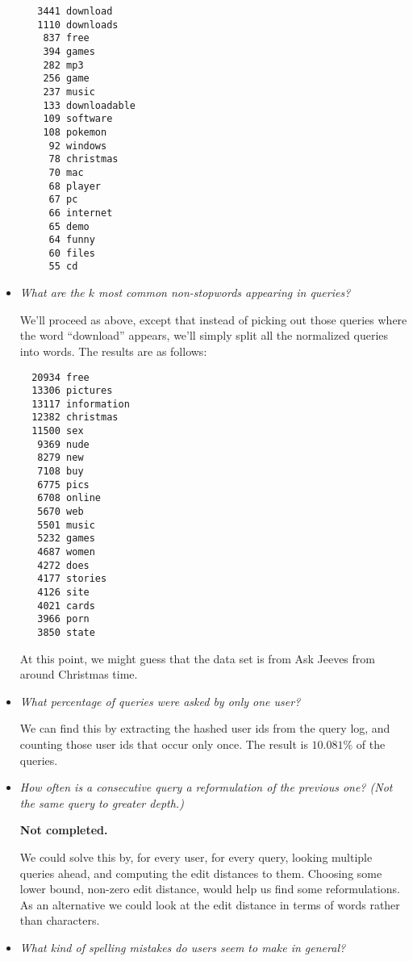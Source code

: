 \begin{itemize}
\begin{lstlisting}
   3441 download
   1110 downloads
    837 free
    394 games
    282 mp3
    256 game
    237 music
    133 downloadable
    109 software
    108 pokemon
     92 windows
     78 christmas
     70 mac
     68 player
     67 pc
     66 internet
     65 demo
     64 funny
     60 files
     55 cd
\end{lstlisting}

\item \emph{What are the $k$ most common non-stopwords appearing in queries?}

We'll proceed as above, except that instead of picking out those queries where
the word ``download'' appears, we'll simply split all the normalized
queries into words. The results are as follows:

\begin{lstlisting}
  20934 free
  13306 pictures
  13117 information
  12382 christmas
  11500 sex
   9369 nude
   8279 new
   7108 buy
   6775 pics
   6708 online
   5670 web
   5501 music
   5232 games
   4687 women
   4272 does
   4177 stories
   4126 site
   4021 cards
   3966 porn
   3850 state
\end{lstlisting}

At this point, we might guess that the data set is from Ask Jeeves from around
Christmas time.

\item \emph{What percentage of queries were asked by only one user?}

We can find this by extracting the hashed user ids from the query log, and
counting those user ids that occur only once. The result is $10.081\%$ of the
queries.

\item \emph{How often is a consecutive query a reformulation of the previous
one? (Not the same query to greater depth.)}

\textbf{Not completed.}

We could solve this by, for every user, for every query, looking multiple
queries ahead, and computing the edit distances\cite[.3 (pp.
58--60)]{irbook} to them. Choosing some lower bound, non-zero edit distance,
would help us find some reformulations. As an alternative we could look at the
edit distance in terms of words rather than characters.

\item \emph{What kind of spelling mistakes do users seem to make in general?}


\end{itemize}
